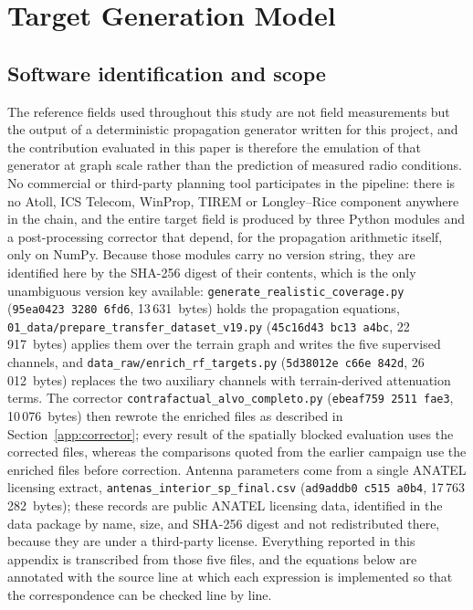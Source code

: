 
\section{Target Generation Model}
\label{app:target-generator}

\subsection{Software identification and scope}

The reference fields used throughout this study are not field measurements
but the output of a deterministic propagation generator written for this
project, and the contribution evaluated in this paper is
therefore the emulation of that generator at graph scale rather than the
prediction of measured radio conditions. No commercial or third-party
planning tool participates in the pipeline: there is no Atoll, ICS Telecom,
WinProp, TIREM or Longley--Rice component anywhere in the chain, and the
entire target field is produced by three Python modules and a post-processing corrector that depend, for
the propagation arithmetic itself, only on NumPy. Because those modules
carry no version string, they are identified here by the SHA-256 digest of
their contents, which is the only unambiguous version key available:
\texttt{generate\_\allowbreak{}realistic\_\allowbreak{}coverage\allowbreak{}.py} (\texttt{95ea0423\,3280\,6fd6},
13\,631~bytes) holds the propagation equations,
\texttt{01\_\allowbreak{}data/\allowbreak{}prepare\_\allowbreak{}transfer\_\allowbreak{}dataset\_\allowbreak{}v19.py}
(\texttt{45c16d43\,bc13\,a4bc}, 22\,917~bytes) applies them over the terrain
graph and writes the five supervised channels, and
\texttt{data\_\allowbreak{}raw/\allowbreak{}enrich\_\allowbreak{}rf\_\allowbreak{}targets\allowbreak{}.py} (\texttt{5d38012e\,c66e\,842d},
26\,012~bytes) replaces the two auxiliary channels with terrain-derived
attenuation terms. The corrector \texttt{contrafactual\_\allowbreak{}alvo\_\allowbreak{}completo\allowbreak{}.py}
(\texttt{ebeaf759\,2511\,fae3}, 10\,076~bytes) then rewrote the enriched files as
described in Section~\ref{app:corrector}; every result of the spatially blocked
evaluation uses the corrected files, whereas the comparisons quoted from the
earlier campaign use the enriched files before correction. Antenna
parameters come from a single ANATEL licensing extract,
\texttt{antenas\_\allowbreak{}interior\_\allowbreak{}sp\_\allowbreak{}final\allowbreak{}.csv}
(\texttt{ad9addb0\,c515\,a0b4}, 17\,763\,282~bytes); these records are public
ANATEL licensing data, identified in the data package by name, size, and
SHA-256 digest and not redistributed there, because they are under a
third-party license. Everything reported in
this appendix is transcribed from those five files, and the equations below
are annotated with the source line at which each expression is implemented
so that the correspondence can be checked line by line.

